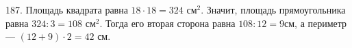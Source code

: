 187. Площадь квадрата равна $18\cdot18=324\text{ см}^2.$ Значит, площадь прямоугольника равна $324:3=108\text{ см}^2.$ Тогда его вторая сторона равна $108:12=9$см, а периметр --- $(12+9)\cdot2=42$ см.\\

